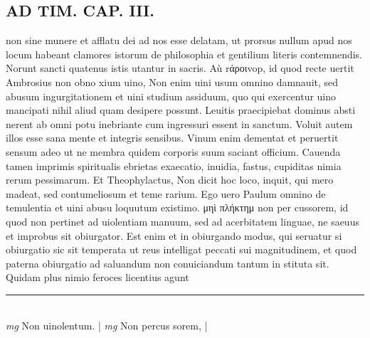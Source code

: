 \documentclass{article}
\begin{document}
\begin{pages}
\section*{AD TIM. CAP. III. }
\marginpar{[ p.127 ]}\pstart non sine munere et afflatu dei ad nos esse delatam, ut prorsus nullum apud nos locum habeant clamores istorum de philosophia et gentilium literis contemnendis. Norunt sancti quatenus istis utantur in sacris. Aù rάροιvop, id quod recte uertit Ambrosius non obno xium uino, Non enim uini usum omnino damnauit, sed abusum ingurgitationem et uini studium assiduum, quo qui exercentur uino mancipati nihil aliud quam desipere possunt. Leuitis praecipiebat dominus absti nerent ab omni potu inebriante cum ingressuri essent in sanctum. Voluit autem illos esse sana mente et integris sensibus. Vinum enim dementat et peruertit sensum adeo ut ne membra quidem corporis suum saciant officium. Cauenda tamen imprimis spiritualis ebrietas exaecatio, inuidia, fastus, cupiditas nimia rerum pessimarum. Et Theophylactus, Non dicit hoc loco, inquit, qui mero madeat, sed contumeliosum et teme rarium. Ego uero Paulum omnino de temulentia et uini abusu loquutum existimo. μηὶ πλήκτημ non per cussorem, id quod non pertinet ad uiolentiam manuum, sed ad acerbitatem linguae, ne saeuus et improbus sit obiurgator. Est enim et in obiurgando modus, qui seruatur si obiurgatio sic sit temperata ut reus intelligat peccati sui magnitudinem, et quod paterna obiurgatio ad saluandum non conuiciandum tantum in stituta sit. Quidam plus nimio feroces licentius agunt  \pend
\vspace{0.5cm}\noindent
\vspace{0.2cm}\rule{1cm}{0.2pt}\\ 
\hspace{0.2cm}\textit{mg}
\footnotesize Non uinolentum. 
\normalsize| 
\hspace{0.2cm}\textit{mg}
\footnotesize Non percus sorem, 
\normalsize| 

\end{pages}
\end{document}
